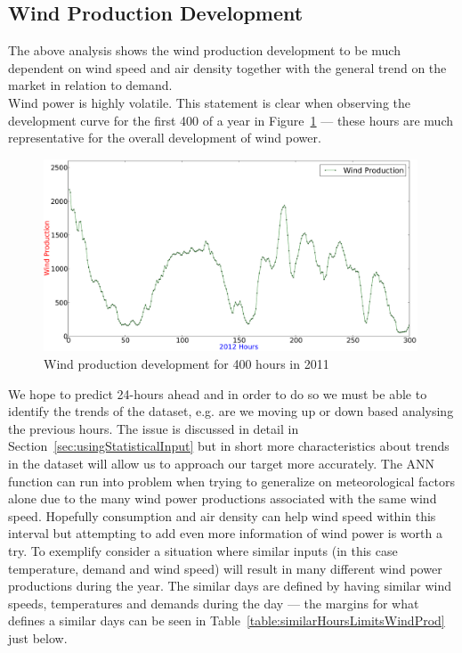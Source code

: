 \subsection{Wind Production Development}
\label{sec:windProductionDev}
The above analysis shows the wind production development to be much dependent on wind speed and air density together with the general trend on the market in relation to demand. 
\\[0.5cm]
Wind power is highly volatile. This statement is clear when observing the development curve for the first 400 of a year in Figure~\ref{fig:windHourDevelopment400Hours} --- these hours are much representative for the overall development of wind power. 

\begin{figure}[ht!]
\centering
\includegraphics[width=0.99\textwidth]{billeder/productionTendency400Hours.png}
\caption{Wind production development for 400 hours in 2011}
\label{fig:windHourDevelopment400Hours}
\end{figure}

\noindent We hope to predict 24-hours ahead and in order to do so we must be able to identify the trends of the dataset, e.g. are we moving up or down based analysing the previous hours. The issue is discussed in detail in Section~\ref{sec:usingStatisticalInput} but in short more characteristics about trends in the dataset will allow us to approach our target more accurately. The ANN function can run into problem when trying to generalize on meteorological factors alone due to the many wind power productions associated with the same wind speed. Hopefully consumption and air density can help wind speed within this interval but attempting to add even more information of wind power is worth a try. To exemplify consider a situation where similar inputs (in this case temperature, demand and wind speed) will result in many different wind power productions during the year. The similar days are defined by having similar wind speeds, temperatures and demands during the day --- the margins for what defines a similar days can be seen in Table~\ref{table:similarHoursLimitsWindProd} just below.

